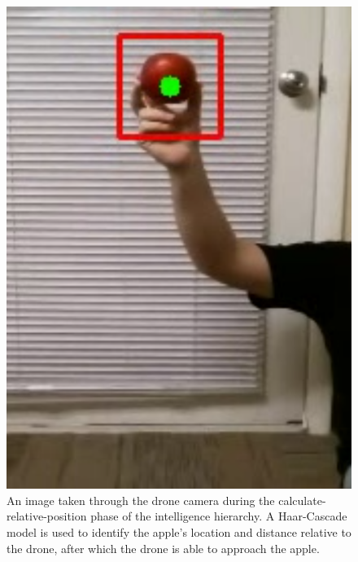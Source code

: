 \begin{figure}[!htb]
    \centering
    \includegraphics[width=\columnwidth,keepaspectratio]
    {./figures/haar-cascade-detection}
    \caption{
        An image taken through the drone camera during the calculate-relative-position phase of the intelligence hierarchy.
        A Haar-Cascade model is used to identify the apple's location and distance relative to the drone, after which the drone is able to approach the apple.
    }
    \label{fig:drone-haar-cascade}
\end{figure}
